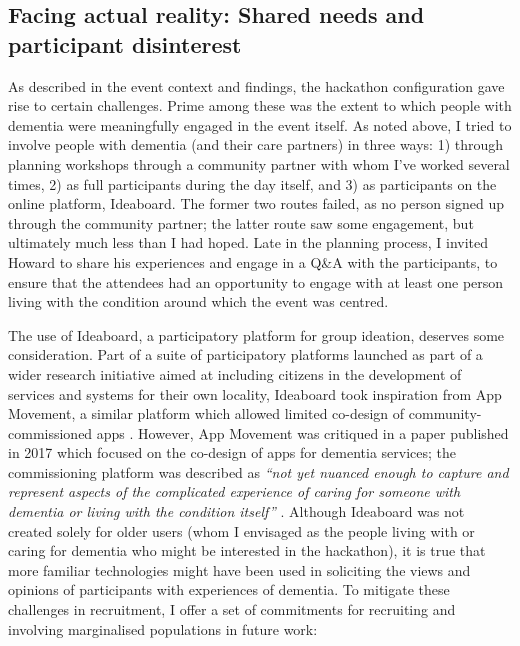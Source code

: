 \subsection{Facing actual reality: Shared needs and participant disinterest}
\label{DiscussionTwo}
As described in the event context and findings, the hackathon configuration gave rise to certain challenges. Prime among these was the extent to which people with dementia were meaningfully engaged in the event itself. As noted above, I tried to involve people with dementia (and their care partners) in three ways: 1) through planning workshops through a community partner with whom I've worked several times, 2) as full participants during the day itself, and 3) as participants on the online platform, Ideaboard. The former two routes failed, as no person signed up through the community partner; the latter route saw some engagement, but ultimately much less than I had hoped. Late in the planning process, I invited Howard to share his experiences and engage in a Q\&A with the participants, to ensure that the attendees had an opportunity to engage with at least one person living with the condition around which the event was centred. 

The use of Ideaboard, a participatory platform for group ideation, deserves some consideration. Part of a suite of participatory platforms launched as part of a wider research initiative aimed at including citizens in the development of services and systems for their own locality, Ideaboard took inspiration from App Movement, a similar platform which allowed limited co-design of community-commissioned apps \citep{garbett_app_2016}. However, App Movement was critiqued in a paper published in 2017 which focused on the co-design of apps for dementia services; the commissioning platform was described as \textit{``not yet nuanced enough to capture and represent aspects of the complicated experience of caring for someone with dementia or living with the condition itself''} \citep{morrissey_care_2017}. Although Ideaboard was not created solely for older users (whom I envisaged as the people living with or caring for dementia who might be interested in the hackathon), it is true that more familiar technologies might have been used in soliciting the views and opinions of participants with experiences of dementia. To mitigate these challenges in recruitment, I offer a set of commitments for recruiting and involving marginalised populations in future work:

